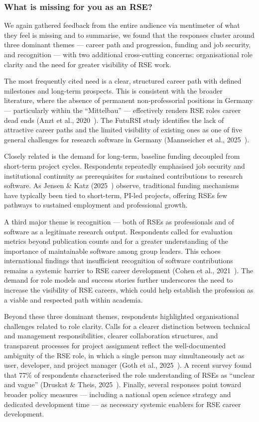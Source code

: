 \documentclass{eceasst}
\begin{document}
\subsubsection{What is missing for you as an RSE?}
We again gathered feedback from the entire audience via mentimeter of what they feel is missing
and to summarise, we found that the responses cluster around three dominant themes — career path and progression, funding and job security, and recognition — with two additional cross-cutting concerns: organisational role clarity and the need for greater visibility of RSE work.

The most frequently cited need is a clear, structured career path with defined milestones and long-term prospects. This is consistent with the broader literature, where the absence of permanent non-professorial positions in Germany — particularly within the \enquote{Mittelbau} — effectively renders RSE roles career dead ends (Anzt et al., 2020 \cite{Anzt:2020}). The FutuRSI study identifies the lack of attractive career paths and the limited visibility of existing ones as one of five general challenges for research software in Germany (Mannseicher et al., 2025 \cite{Mannseicher:2025a}).

Closely related is the demand for long-term, baseline funding decoupled from short-term project cycles. Respondents repeatedly emphasised job security and institutional continuity as prerequisites for sustained contributions to research software. As Jensen \& Katz (2025 \cite{Jensen:2025c}) observe, traditional funding mechanisms have typically been tied to short-term, PI-led projects, offering RSEs few pathways to sustained employment and professional growth.

A third major theme is recognition — both of RSEs as professionals and of software as a legitimate research output. Respondents called for evaluation metrics beyond publication counts and for a greater understanding of the importance of maintainable software among group leaders. This echoes international findings that insufficient recognition of software contributions remains a systemic barrier to RSE career development (Cohen et al., 2021 \cite{Cohen:2021}). The demand for role models and success stories further underscores the need to increase the visibility of RSE careers, which could help establish the profession as a viable and respected path within academia.

Beyond these three dominant themes, respondents highlighted organisational challenges related to role clarity. Calls for a clearer distinction between technical and management responsibilities, clearer collaboration structures, and transparent processes for project assignment reflect the well-documented ambiguity of the RSE role, in which a single person may simultaneously act as user, developer, and project manager (Goth et al., 2025 \cite{Goth:2025}). A recent survey found that 77\% of respondents characterised the role understanding of RSEs as \enquote{unclear and vague} (Druskat \& Theis, 2025 \cite{Druskat:2025a}). Finally, several responses point toward broader policy measures — including a national open science strategy and dedicated development time — as necessary systemic enablers for RSE career development.
\end{document}
